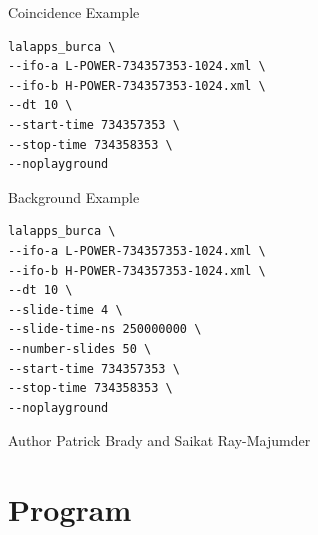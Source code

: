 \begin{entry}
\item[Coincidence Example]
\begin{verbatim}
lalapps_burca \
--ifo-a L-POWER-734357353-1024.xml \
--ifo-b H-POWER-734357353-1024.xml \
--dt 10 \
--start-time 734357353 \
--stop-time 734358353 \
--noplayground
\end{verbatim}

\item[Background Example]
\begin{verbatim}
lalapps_burca \
--ifo-a L-POWER-734357353-1024.xml \
--ifo-b H-POWER-734357353-1024.xml \
--dt 10 \
--slide-time 4 \
--slide-time-ns 250000000 \
--number-slides 50 \
--start-time 734357353 \
--stop-time 734358353 \
--noplayground
\end{verbatim}

\item[Author] 
Patrick Brady and Saikat Ray-Majumder
\end{entry}
\clearpage


\section{Program }
\label{program:lalapps-binj}

